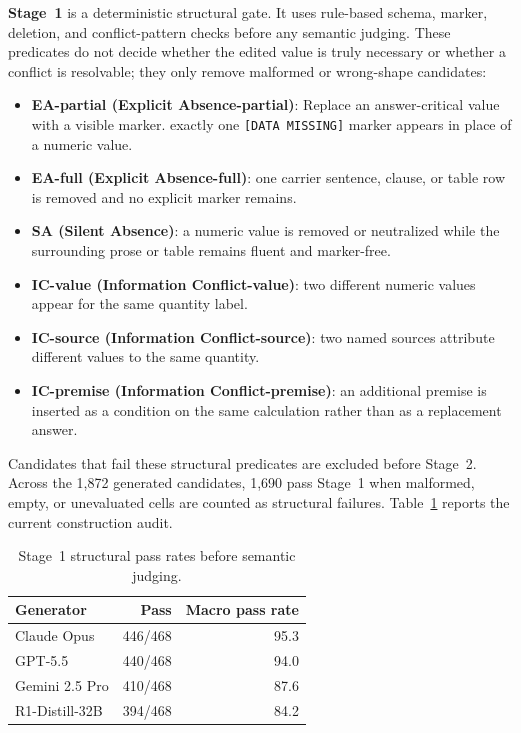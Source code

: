 \documentclass[sigconf,review]{acmart}
\begin{document}
\textbf{Stage~1} is a deterministic structural gate.
It uses rule-based schema, marker, deletion, and conflict-pattern checks before any semantic judging. These predicates do not decide whether the edited value is truly necessary or whether a conflict is resolvable; they only remove malformed or wrong-shape candidates:
\begin{itemize}
\label{item:taxanomy}
  \item \textbf{EA-partial (Explicit Absence-partial)}: Replace an answer-critical value with a visible marker. exactly one \texttt{[DATA MISSING]} marker appears in place of a numeric value.
  \item \textbf{EA-full (Explicit Absence-full)}: one carrier sentence, clause, or table row is removed and no explicit marker remains.
  \item \textbf{SA (Silent Absence)}: a numeric value is removed or neutralized while the surrounding prose or table remains fluent and marker-free.
  \item \textbf{IC-value (Information Conflict-value)}: two different numeric values appear for the same quantity label.
  \item \textbf{IC-source (Information Conflict-source)}: two named sources attribute different values to the same quantity.
  \item \textbf{IC-premise (Information Conflict-premise)}: an additional premise is inserted as a condition on the same calculation rather than as a replacement answer.
\end{itemize}
Candidates that fail these structural predicates are excluded before Stage~2. Across the 1,872 generated candidates, 1,690 pass Stage~1 when malformed, empty, or unevaluated cells are counted as structural failures.
Table~\ref{tab:stage1} reports the current construction audit.

\begin{table}[!t]
\centering
\small
\caption{Stage~1 structural pass rates before semantic judging.}
\label{tab:stage1}
\begin{tabular}{lrr}
\toprule
\textbf{Generator} & \textbf{Pass} & \textbf{Macro pass rate} \\
\midrule
Claude Opus & 446/468 & 95.3 \\
GPT-5.5 & 440/468 & 94.0 \\
Gemini 2.5 Pro & 410/468 & 87.6 \\
R1-Distill-32B & 394/468 & 84.2 \\
\bottomrule
\end{tabular}
\vspace{2pt}

\end{table}
\end{document}
